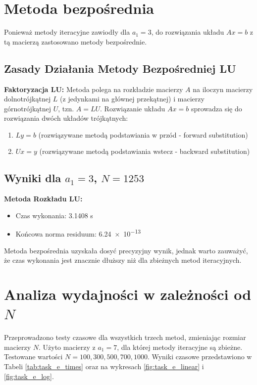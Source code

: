 \documentclass[a4paper, 11pt]{article}
\begin{document}
\section{Metoda bezpośrednia}
Ponieważ metody iteracyjne zawiodły dla $a_1=3$, do rozwiązania układu $Ax=b$ z tą macierzą zastosowano metody bezpośrednie.

\subsection{Zasady Działania Metody Bezpośredniej LU}

\textbf{Faktoryzacja LU:} Metoda polega na rozkładzie macierzy $A$ na iloczyn macierzy dolnotrójkątnej $L$ (z jedynkami na głównej przekątnej) i macierzy górnotrójkątnej $U$, tzn. $A = LU$. Rozwiązanie układu $Ax=b$ sprowadza się do rozwiązania dwóch układów trójkątnych:
\begin{enumerate}
    \item $Ly = b$ (rozwiązywane metodą podstawiania w przód - forward substitution)
    \item $Ux = y$ (rozwiązywane metodą podstawiania wstecz - backward substitution)
\end{enumerate}

\subsection{Wyniki dla $a_1=3$, $N=1253$}

\textbf{Metoda Rozkładu LU:}
\begin{itemize}
    \item Czas wykonania: \num{3.1408} s
    \item Końcowa norma residuum: \num{6.24e-13}
\end{itemize}

Metoda bezpośrednia uzyskała dosyć precyzyjny wynik, jednak warto zauważyć, że czas wykonania jest znacznie dłuższy niż dla zbieżnych metod iteracyjnych.

\section{Analiza wydajności w zależności od $N$}
Przeprowadzono testy czasowe dla wszystkich trzech metod, zmieniając rozmiar macierzy $N$. Użyto macierzy z $a_1=7$, dla której metody iteracyjne są zbieżne. Testowane wartości $N={100, 300, 500, 700, 1000}$. Wyniki czasowe przedstawiono w Tabeli \ref{tab:task_e_times} oraz na wykresach \ref{fig:task_e_linear} i \ref{fig:task_e_log}.
\end{document}
